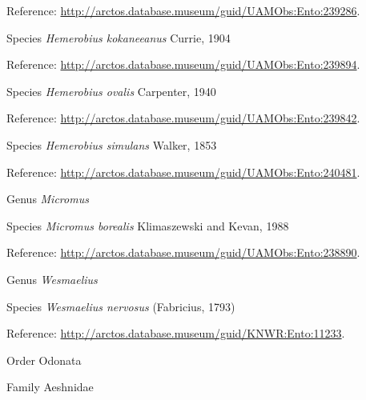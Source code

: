 \documentclass[9pt, article]{memoir}
\begin{document}
\begin{multicols}{2}
\vspace{6pt}Reference: 
\url{http://arctos.database.museum/guid/UAMObs:Ento:239286}.

\vspace{6pt}\noindent\hspace{36pt}Species \textit{Hemerobius kokaneeanus} Currie, 1904


\vspace{6pt}Reference: 
\url{http://arctos.database.museum/guid/UAMObs:Ento:239894}.

\vspace{6pt}\noindent\hspace{36pt}Species \textit{Hemerobius ovalis} Carpenter, 1940


\vspace{6pt}Reference: 
\url{http://arctos.database.museum/guid/UAMObs:Ento:239842}.

\vspace{6pt}\noindent\hspace{36pt}Species \textit{Hemerobius simulans} Walker, 1853


\vspace{6pt}Reference: 
\url{http://arctos.database.museum/guid/UAMObs:Ento:240481}.

\vspace{6pt}\noindent\hspace{30pt}Genus \textit{Micromus}


\vspace{6pt}\noindent\hspace{36pt}Species \textit{Micromus borealis} Klimaszewski and Kevan, 1988


\vspace{6pt}Reference: 
\url{http://arctos.database.museum/guid/UAMObs:Ento:238890}.

\vspace{6pt}\noindent\hspace{30pt}Genus \textit{Wesmaelius}


\vspace{6pt}\noindent\hspace{36pt}Species \textit{Wesmaelius nervosus} (Fabricius, 1793)


\vspace{6pt}Reference: 
\url{http://arctos.database.museum/guid/KNWR:Ento:11233}.

\vspace{6pt}\noindent\hspace{18pt}Order Odonata


\vspace{6pt}\noindent\hspace{24pt}Family Aeshnidae



\end{multicols}
\end{document}
